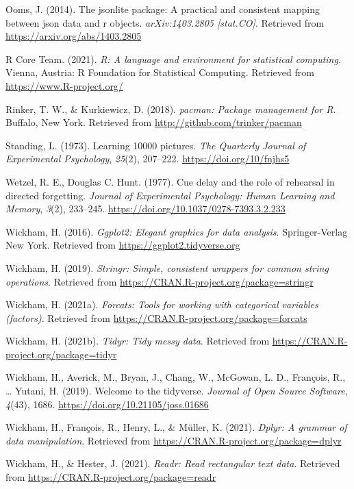 \documentclass[
  english,
  man,floatsintext]{apa6}
\begin{document}
\leavevmode\hypertarget{ref-R-jsonlite}{}%
Ooms, J. (2014). The jsonlite package: A practical and consistent mapping between json data and r objects. \emph{arXiv:1403.2805 {[}stat.CO{]}}. Retrieved from \url{https://arxiv.org/abs/1403.2805}

\leavevmode\hypertarget{ref-R-base}{}%
R Core Team. (2021). \emph{R: A language and environment for statistical computing}. Vienna, Austria: R Foundation for Statistical Computing. Retrieved from \url{https://www.R-project.org/}

\leavevmode\hypertarget{ref-R-pacman}{}%
Rinker, T. W., \& Kurkiewicz, D. (2018). \emph{pacman: Package management for R}. Buffalo, New York. Retrieved from \url{http://github.com/trinker/pacman}

\leavevmode\hypertarget{ref-standingLearning10000Pictures1973}{}%
Standing, L. (1973). Learning 10000 pictures. \emph{The Quarterly Journal of Experimental Psychology}, \emph{25}(2), 207--222. \url{https://doi.org/10/fnjhs5}

\leavevmode\hypertarget{ref-WetzelC1977}{}%
Wetzel, R. E., Douglas C. Hunt. (1977). Cue delay and the role of rehearsal in directed forgetting. \emph{Journal of Experimental Psychology: Human Learning and Memory}, \emph{3}(2), 233--245. \url{https://doi.org/10.1037/0278-7393.3.2.233}

\leavevmode\hypertarget{ref-R-ggplot2}{}%
Wickham, H. (2016). \emph{Ggplot2: Elegant graphics for data analysis}. Springer-Verlag New York. Retrieved from \url{https://ggplot2.tidyverse.org}

\leavevmode\hypertarget{ref-R-stringr}{}%
Wickham, H. (2019). \emph{Stringr: Simple, consistent wrappers for common string operations}. Retrieved from \url{https://CRAN.R-project.org/package=stringr}

\leavevmode\hypertarget{ref-R-forcats}{}%
Wickham, H. (2021a). \emph{Forcats: Tools for working with categorical variables (factors)}. Retrieved from \url{https://CRAN.R-project.org/package=forcats}

\leavevmode\hypertarget{ref-R-tidyr}{}%
Wickham, H. (2021b). \emph{Tidyr: Tidy messy data}. Retrieved from \url{https://CRAN.R-project.org/package=tidyr}

\leavevmode\hypertarget{ref-R-tidyverse}{}%
Wickham, H., Averick, M., Bryan, J., Chang, W., McGowan, L. D., François, R., \ldots{} Yutani, H. (2019). Welcome to the tidyverse. \emph{Journal of Open Source Software}, \emph{4}(43), 1686. \url{https://doi.org/10.21105/joss.01686}

\leavevmode\hypertarget{ref-R-dplyr}{}%
Wickham, H., François, R., Henry, L., \& Müller, K. (2021). \emph{Dplyr: A grammar of data manipulation}. Retrieved from \url{https://CRAN.R-project.org/package=dplyr}

\leavevmode\hypertarget{ref-R-readr}{}%
Wickham, H., \& Hester, J. (2021). \emph{Readr: Read rectangular text data}. Retrieved from \url{https://CRAN.R-project.org/package=readr}

\endgroup
\end{document}
